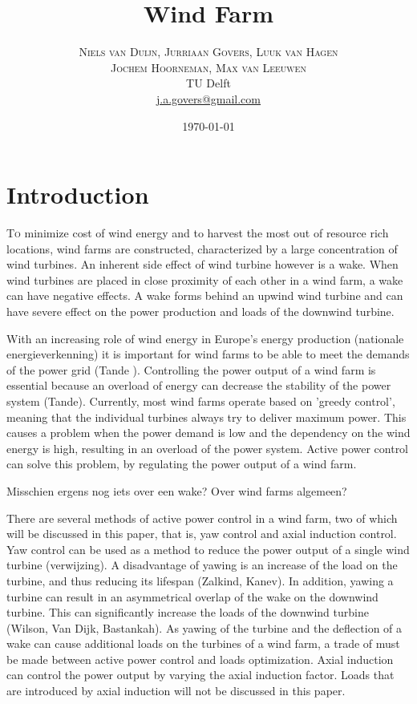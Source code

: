 \documentclass[twoside,twocolumn]{article}
\title{Wind Farm} %
\author{%
	\textsc{Niels van Duijn, Jurriaan Govers, Luuk van Hagen}\\
	\textsc{Jochem Hoorneman, Max van Leeuwen}\\%
	\normalsize TU Delft \\ %
	\normalsize \href{mailto:j.a.govers@gmail.com}{j.a.govers@gmail.com} %
}
\date{\today} %
\begin{document}
	
	\maketitle
	
	
	\section{Introduction}
	
	\lettrine[nindent=0em,lines=3]To minimize cost of wind energy and to harvest the most out of resource rich locations, wind farms are constructed, characterized by a large concentration of wind turbines. An inherent side effect of wind turbine however is a wake. When wind turbines are placed in close proximity of each other in a wind farm, a wake can have negative effects. A wake forms behind an upwind wind turbine and can have severe effect on the power production and loads of the downwind turbine.

With an increasing role of wind energy in Europe's energy production (nationale energieverkenning) it is important for wind farms to be able to meet the demands of the power grid (Tande ). Controlling the power output of a wind farm is essential because an overload of energy can decrease the stability of the power system (Tande). Currently, most wind farms operate based on 'greedy control', meaning that the individual turbines always try to deliver maximum power. This causes a problem when the power demand is low and the dependency on the wind energy is high, resulting in an overload of the power system. Active power control can solve this problem, by regulating the power output of a wind farm.

Misschien ergens nog iets over een wake? Over wind farms algemeen?

There are several methods of active power control in a wind farm, two of which will be discussed in this paper, that is, yaw control and axial induction control. Yaw control can be used as a method to reduce the power output of a single wind turbine (verwijzing). A disadvantage of yawing is an increase of the load on the turbine, and thus reducing its lifespan (Zalkind, Kanev). In addition, yawing a turbine can result in an asymmetrical overlap of the wake on the downwind turbine. This can significantly increase the loads of the downwind turbine (Wilson, Van Dijk, Bastankah). As yawing of the turbine and the deflection of a wake can cause additional loads on the turbines of a wind farm, a trade of must be made between active power control and loads optimization. Axial induction can control the power output by varying the axial induction factor. Loads that are introduced by axial induction will not be discussed in this paper. 
\end{document}

